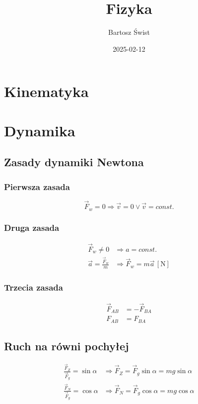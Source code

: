 \documentclass{article}
\title{Fizyka}
\date{2025-02-12}
\author{Bartosz Świst}
\numberwithin{equation}{section}
\newcommand{\unit}[1]{\, \left[\mathrm{#1}\right]}
\begin{document}
  \maketitle
  \newpage

  \section{Kinematyka}

  \newpage
  \section{Dynamika}
    \subsection{Zasady dynamiki Newtona}
      \subsubsection{Pierwsza zasada}
        \begin{equation}
          \vec F_w = 0 \Rightarrow \vec v = 0 \lor \vec v = const.
        \end{equation}
      \subsubsection{Druga zasada}
        \begin{align}
          \vec F_w \ne 0 &\Rightarrow a = const.\\
          \vec a = \frac{\vec F_w}{m} &\Rightarrow \vec F_w = m\vec a \unit{N}
        \end{align}
      \subsubsection{Trzecia zasada}
        \begin{align}
          \vec F_{AB} &= -\vec F_{BA}\\
          F_{AB} &= F_{BA}
        \end{align}
    \subsection{Ruch na równi pochyłej}
      \begin{align}
        \frac{\vec F_Z}{\vec F_g} = \sin\alpha &\Rightarrow \vec F_Z = \vec F_g\sin\alpha = mg\sin\alpha\\
        \frac{\vec F_N}{\vec F_g} = \cos\alpha &\Rightarrow \vec F_N = \vec F_g\cos\alpha = mg\cos\alpha
      \end{align}
\end{document}
